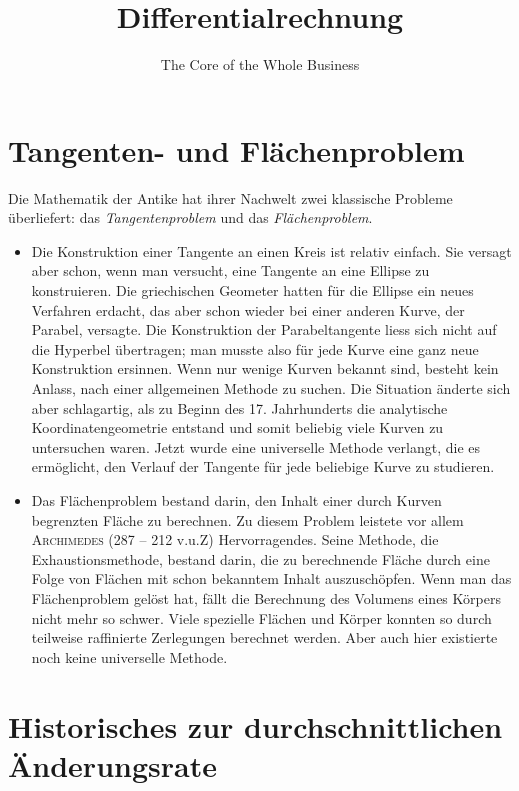 \documentclass[%
11pt,%
twoside,%
titlepage,%
german,%
headsepline%
]{scrartcl}
\title{Differentialrechnung}
\subtitle{The Core of the Whole Business}
\author{}
\date{}
\theoremstyle{definition}
\theoremstyle{plain}
\begin{document}
\maketitle
\tableofcontents
\cleardoublepage

\section{Tangenten- und Flächenproblem}
Die Mathematik der Antike hat ihrer Nachwelt zwei klassische Probleme überliefert: das \emph{Tangentenproblem} und das \emph{Flächenproblem}.

\begin{itemize}
\item Die Konstruktion einer Tangente an einen Kreis ist relativ einfach. Sie versagt aber schon, wenn man versucht, eine Tangente an eine Ellipse zu konstruieren. Die griechischen Geometer hatten für die Ellipse ein neues Verfahren erdacht, das aber schon wieder bei einer anderen Kurve, der Parabel, versagte. Die Konstruktion der Parabeltangente liess sich nicht auf die Hyperbel übertragen; man musste also für jede Kurve eine ganz neue Konstruktion ersinnen. Wenn nur wenige Kurven bekannt sind, besteht kein Anlass, nach einer allgemeinen Methode zu suchen. Die Situation änderte sich aber schlagartig, als zu Beginn des 17. Jahrhunderts die analytische Koordinatengeometrie entstand und somit beliebig viele Kurven zu untersuchen waren. Jetzt wurde eine universelle Methode verlangt, die es ermöglicht, den Verlauf der Tangente für jede beliebige Kurve zu studieren.
\end{itemize}

\begin{itemize}
\item Das Flächenproblem bestand darin, den Inhalt einer durch Kurven begrenzten Fläche zu berechnen. Zu diesem Problem leistete vor allem \textsc{Archimedes} (287 -- 212 v.u.Z) Hervorragendes. Seine Methode, die Exhaustionsmethode, bestand darin, die zu berechnende Fläche durch eine Folge von Flächen mit schon bekanntem Inhalt auszuschöpfen. Wenn man das Flächenproblem gelöst hat, fällt die Berechnung des Volumens eines Körpers nicht mehr so schwer. Viele spezielle Flächen und Körper konnten so durch teilweise raffinierte Zerlegungen berechnet werden. Aber auch hier existierte noch keine universelle Methode.
\end{itemize}

\clearpage

\section{Historisches zur durchschnittlichen Änderungsrate}
\end{document}
